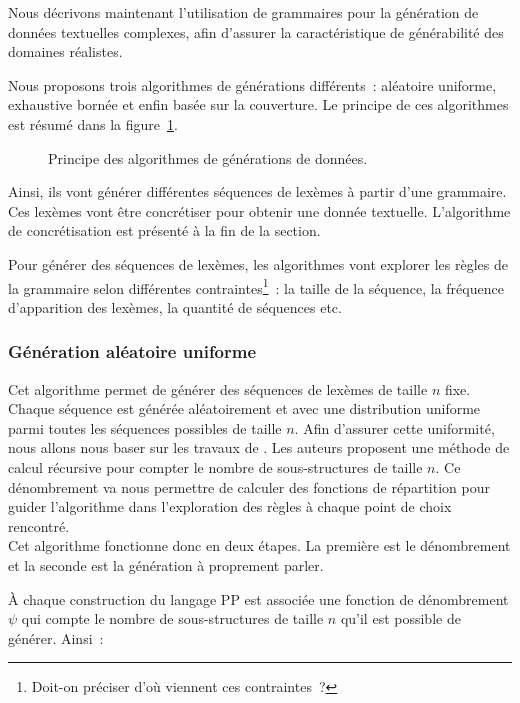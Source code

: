 Nous décrivons maintenant l'utilisation de grammaires pour la génération de
données textuelles complexes, afin d'assurer la caractéristique de générabilité
des domaines réalistes.

Nous proposons trois algorithmes de générations différents~: aléatoire uniforme,
exhaustive bornée et enfin basée sur la couverture. Le principe de ces
algorithmes est résumé dans la figure~\ref{figure:data:grammar}.
%
\begin{figure}


\caption{\label{figure:data:grammar} Principe des algorithmes de générations de
données.}

\end{figure}
%
Ainsi, ils vont générer différentes séquences de lexèmes à partir d'une
grammaire. Ces lexèmes vont être concrétiser pour obtenir une donnée
textuelle. L'algorithme de concrétisation est présenté à la fin de la section.

Pour générer des séquences de lexèmes, les algorithmes vont explorer les règles
de la grammaire selon différentes contraintes\footnote{Doit-on préciser d'où
viennent ces contraintes~?}~: la taille de la séquence, la fréquence
d'apparition des lexèmes, la quantité de séquences etc.

\subsubsection{Génération aléatoire uniforme}
\label{subsection:data:random_uniform_generation}

Cet algorithme permet de générer des séquences de lexèmes de taille $n$ fixe.
Chaque séquence est générée aléatoirement et avec une distribution uniforme
parmi toutes les séquences possibles de taille $n$. Afin d'assurer cette
uniformité, nous allons nous baser sur les travaux de . Les
auteurs proposent une méthode de calcul récursive pour compter le nombre de
sous-structures de taille $n$. Ce dénombrement va nous permettre de calculer des
fonctions de répartition pour guider l'algorithme dans l'exploration des règles
à chaque point de choix rencontré. \\
Cet algorithme fonctionne donc en deux étapes. La première est le dénombrement
et la seconde est la génération à proprement parler.

À chaque construction du langage PP est associée une fonction de dénombrement
$\psi$ qui compte le nombre de sous-structures de taille $n$ qu'il est possible
de générer. Ainsi~:

